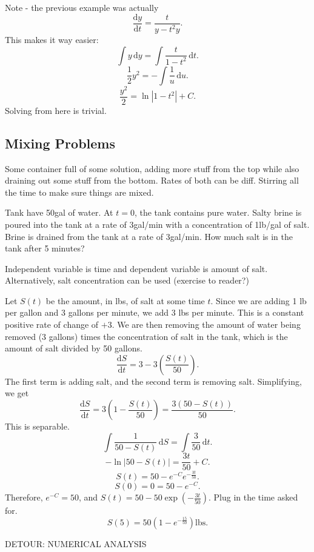 
Note - the previous example was actually
\[
	\frac{\mathrm{d}y}{\mathrm{d}t} =\frac{t}{y-t^2y}
.\]
This makes it way easier:
\[
	\int y \,\mathrm{d} y=\int \frac{t}{1-t^2} \,\mathrm{d} t
.\]
\[
	\frac{1}{2}y^2=-\int \frac{1}{u} \,\mathrm{d} u
.\]
\[
	\frac{y^2}{2}=\ln \left| 1-t^2 \right| +C
.\]
Solving from here is trivial.

\subsection{Mixing Problems}
Some container full of some solution, adding more stuff from the top while also draining out some stuff from the bottom. Rates of both can be diff. Stirring all the time to make sure things are mixed.
\begin{example}
	Tank have 50gal of water. At $t=0$, the tank contains pure water. Salty brine is poured into the tank at a rate of 3gal/min with a concentration of 1lb/gal of salt. Brine is drained from the tank at a rate of 3gal/min. How much salt is in the tank after 5 minutes?
\end{example}
\begin{solution}
	Independent variable is time and dependent variable is amount of salt. Alternatively, salt concentration can be used (exercise to reader?)

	Let $S(t)$ be the amount, in lbs, of salt at some time $t$. Since we are adding 1 lb per gallon and 3 gallons per minute, we add 3 lbs per minute. This is a constant positive rate of change of $+3$. We are then removing the amount of water being removed (3 gallons) times the concentration of salt in the tank, which is the amount of salt divided by 50 gallons.
	\[
		\frac{\mathrm{d}S}{\mathrm{d}t} =3-3\left( \frac{S(t)}{50} \right) 
	.\]
	The first term is adding salt, and the second term is removing salt. Simplifying, we get
	\[
		\frac{\mathrm{d}S}{\mathrm{d}t} =3\left( 1-\frac{S(t)}{50} \right) =\frac{3(50-S(t))}{50}
	.\]
	This is separable.
	\[
		\int \frac{1}{50-S(t)} \,\mathrm{d} S=\int \frac{3}{50} \,\mathrm{d} t
	.\]
	\[
		-\ln \left| 50-S(t) \right| =\frac{3t}{50}+C
	.\]
	\[
		S(t)=50-e^{-C}e^{-\frac{3t}{50}}
	.\]
	\[
		S(0)=0=50-e^{-C}
	.\]
	Therefore, $e^{-C}=50$, and $S(t)=50-50\exp \left( -\frac{3t}{50} \right) $.
	Plug in the time asked for.
	\[
		S(5)=50\left( 1-e^{-\frac{15}{50}} \right) \text{lbs}
	.\]
\end{solution}
DETOUR: NUMERICAL ANALYSIS

